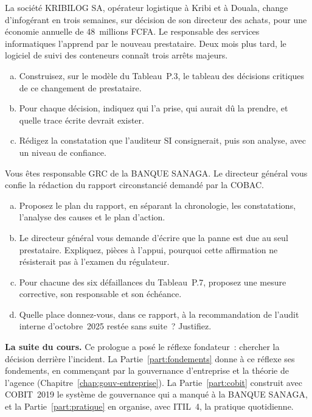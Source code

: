 \begin{boxexo}[title={\ding{45}\quad Exercice~P.2. Les droits de décision de KRIBILOG \niveaumoyen}]
La société KRIBILOG SA, opérateur logistique à Kribi et à Douala, change
d'infogérant en trois semaines, sur décision de son directeur des achats,
pour une économie annuelle de 48~millions FCFA. Le responsable des services
informatiques l'apprend par le nouveau prestataire. Deux mois plus tard, le
logiciel de suivi des conteneurs connaît trois arrêts majeurs.
\begin{enumerate}[(a)]
    \item Construisez, sur le modèle du Tableau~P.3, le tableau des
          décisions critiques de ce changement de prestataire.
    \item Pour chaque décision, indiquez qui l'a prise, qui aurait dû la
          prendre, et quelle trace écrite devrait exister.
    \item Rédigez la constatation que l'auditeur SI consignerait, puis son
          analyse, avec un niveau de confiance.
\end{enumerate}
\end{boxexo}

\begin{boxexo}[title={\ding{45}\quad Exercice~P.3. Le rapport à la COBAC \niveauexpert}]
Vous êtes responsable GRC de la BANQUE SANAGA. Le directeur général vous
confie la rédaction du rapport circonstancié demandé par la COBAC.
\begin{enumerate}[(a)]
    \item Proposez le plan du rapport, en séparant la chronologie, les
          constatations, l'analyse des causes et le plan d'action.
    \item Le directeur général vous demande d'écrire que la panne est due
          au seul prestataire. Expliquez, pièces à l'appui, pourquoi cette
          affirmation ne résisterait pas à l'examen du régulateur.
    \item Pour chacune des six défaillances du Tableau~P.7, proposez une
          mesure corrective, son responsable et son échéance.
    \item Quelle place donnez-vous, dans ce rapport, à la recommandation de
          l'audit interne d'octobre~2025 restée sans suite~? Justifiez.
\end{enumerate}
\end{boxexo}

\bigskip

\begin{boxinfo}
\textbf{La suite du cours.} Ce prologue a posé le réflexe fondateur~:
chercher la décision derrière l'incident. La Partie~\ref{part:fondements}
donne à ce réflexe ses fondements, en commençant par la gouvernance
d'entreprise et la théorie de l'agence (Chapitre~\ref{chap:gouv-entreprise}).
La Partie~\ref{part:cobit} construit avec COBIT~2019 le système de
gouvernance qui a manqué à la BANQUE SANAGA, et la
Partie~\ref{part:pratique} en organise, avec ITIL~4, la pratique
quotidienne.
\end{boxinfo}
